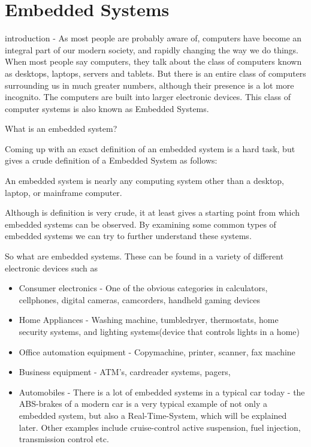 \section{Embedded Systems}
introduction - As most people are probably aware of, computers have become an integral part of our modern society,
and rapidly changing the way we do things. When most people say computers, they talk about the class of computers
known as desktops, laptops, servers and tablets. But there is an entire class of computers surrounding us in much greater numbers,
although their presence is a lot more incognito. The computers are built into larger electronic devices.
This class of computer systems is also known as Embedded Systems.

What is an embedded system?

Coming up with an exact definition of an embedded system is a hard task, but \citep{vahid1999embedded} gives a crude
definition of a Embedded System as follows: \nl

An  embedded  system  is  nearly  any computing system other than a desktop, laptop, or  mainframe  computer.

Although is definition is very crude, it at least gives a starting point from which embedded systems can be observed.
By examining some common types of embedded systems we can try to further understand these systems.\nl

So what are embedded systems. These can be found in a variety of different electronic devices such as
\begin{itemize}
\item Consumer electronics - One of the obvious categories in calculators, cellphones, digital cameras, camcorders, handheld gaming devices
\item Home Appliances - Washing machine, tumbledryer, thermostats, home security systems, and lighting systems(device that controls lights in a home)
\item Office automation equipment - Copymachine, printer, scanner, fax machine
\item Business equipment - ATM's, cardreader systems, pagers,
\item Automobiles - There is a lot of embedded systems in a typical car today - the ABS-brakes of a modern car is a very typical
example of not only a embedded system, but also a Real-Time-System, which will be explained later. Other examples include cruise-control
active suspension, fuel injection, transmission control etc.
\end{itemize}
\nl


